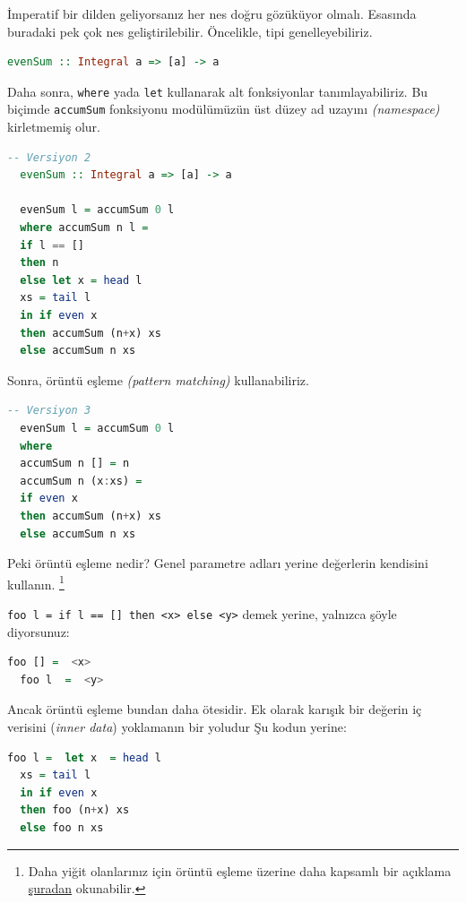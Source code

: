 \documentclass[a4paper,14pt,openany]{extbook} %
\let\emph\textit
\begin{document}
İmperatif bir dilden geliyorsanız her nes doğru gözüküyor olmalı.
Esasında buradaki pek çok nes geliştirilebilir. Öncelikle, tipi
genelleyebiliriz.

\begin{lstlisting}[language=Haskell]
  evenSum :: Integral a => [a] -> a
\end{lstlisting}

Daha sonra, \lstinline!where! yada \lstinline!let! kullanarak alt
fonksiyonlar tanımlayabiliriz. Bu biçimde  \lstinline!accumSum!
fonksiyonu modülümüzün üst düzey ad uzayını \emph{(namespace)}
kirletmemiş olur.

\begin{lstlisting}[language=Haskell]
  -- Versiyon 2
  evenSum :: Integral a => [a] -> a

  evenSum l = accumSum 0 l
  where accumSum n l =
  if l == []
  then n
  else let x = head l
  xs = tail l
  in if even x
  then accumSum (n+x) xs
  else accumSum n xs
\end{lstlisting}

Sonra, örüntü eşleme \emph{(pattern matching)} kullanabiliriz.

\begin{lstlisting}[language=Haskell]
  -- Versiyon 3
  evenSum l = accumSum 0 l
  where
  accumSum n [] = n
  accumSum n (x:xs) =
  if even x
  then accumSum (n+x) xs
  else accumSum n xs
\end{lstlisting}

Peki örüntü eşleme nedir? Genel parametre adları yerine değerlerin
kendisini kullanın. \footnote{Daha yiğit olanlarınız için örüntü
eşleme üzerine daha kapsamlı bir açıklama 
\href{http://www.cs.auckland.ac.nz/references/haskell/haskell-intro-html/patterns.html}{şuradan}
okunabilir.}

\lstinline!foo l = if l == [] then <x> else <y>! demek yerine, yalnızca
şöyle diyorsunuz:

\begin{lstlisting}[language=Haskell]
  foo [] =  <x>
  foo l  =  <y>
\end{lstlisting}

Ancak örüntü eşleme bundan daha ötesidir. %
Ek olarak
karışık %
bir değerin iç verisini (\emph{inner data}) yoklamanın bir yoludur
Şu kodun yerine:

\begin{lstlisting}[language=Haskell]
  foo l =  let x  = head l
  xs = tail l
  in if even x
  then foo (n+x) xs
  else foo n xs
\end{lstlisting}
\end{document}
